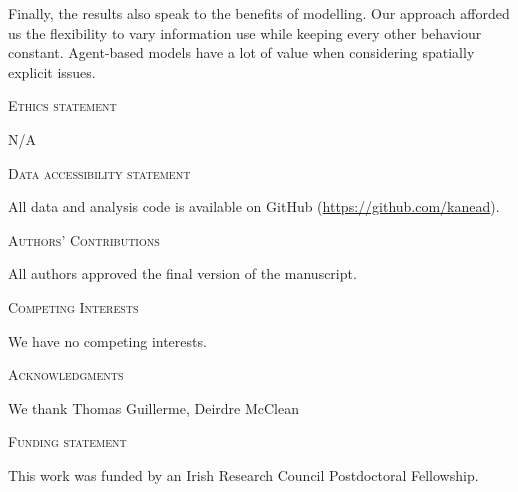 \documentclass[12pt,letterpaper]{article}
\renewcommand{\section}[1]{%
\bigskip
\begin{center}
\begin{Large}
\normalfont\scshape #1
\medskip
\end{Large}
\end{center}}
\begin{document}
Finally, the results also speak to the benefits of modelling. Our approach afforded us the flexibility to vary information use while keeping every other behaviour constant. Agent-based models have a lot of value when considering spatially explicit issues. 


\section{Ethics statement}
N/A
\section{Data accessibility statement}
All data and analysis code is available on GitHub (\url{https://github.com/kanead}).
\section{Authors' Contributions}
All authors approved the final version of the manuscript.
\section{Competing Interests}
We have no competing interests.
\section{Acknowledgments}
We thank Thomas Guillerme, Deirdre McClean
\section{Funding statement}
This work was funded by an Irish Research Council Postdoctoral Fellowship.




\end{document}
